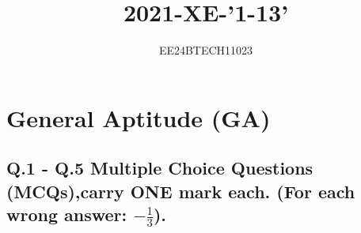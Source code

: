 \documentclass[journal,12pt,onecolumn]{IEEEtran}
\theoremstyle{remark}
\begin{document}

\vspace{3cm}


\title{2021-XE-'1-13'}
\author{EE24BTECH11023}
\maketitle

\section*{General Aptitude (GA)}

\subsection*{Q.1 - Q.5 Multiple Choice Questions (MCQs),carry \textbf{ONE} mark each. (For each wrong answer: $-\frac{1}{3}$).}


{\let\newpage\relax\maketitle}

\renewcommand{\thefigure}{\theenumi}
\renewcommand{\thetable}{\theenumi}
\setlength{\intextsep}{10pt} %


\renewcommand{\thetable}{\theenumi}
\end{document}
